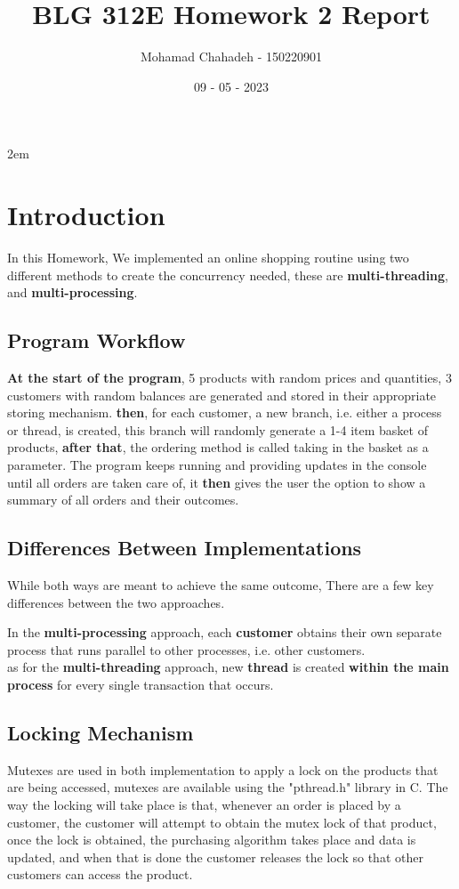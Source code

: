 \documentclass[pdftex,12pt,a4paper]{article}
\title{BLG 312E Homework 2 Report}
\author{Mohamad Chahadeh - 150220901}
\date{09 - 05 - 2023}
\begin{document}
{\def\null\vskip 2em{}\maketitle}

\section{Introduction}
In this Homework, We implemented an online shopping routine using two different methods to create the concurrency needed, these are \textbf{multi-threading}, and \textbf{multi-processing}.

\subsection{Program Workflow}
\textbf{At the start of the program}, 5 products with random prices and quantities, 3 customers with random balances are generated and stored in their appropriate storing mechanism. \textbf{then}, for each customer, a new branch, i.e. either a process or thread, is created, this branch will randomly generate a 1-4 item basket of products, \textbf{after that}, the ordering method is called taking in the basket as a parameter. The program keeps running and providing updates in the console until all orders are taken care of, it \textbf{then} gives the user the option to show a summary of all orders and their outcomes.

\subsection{Differences Between Implementations}
While both ways are meant to achieve the same outcome, There are a few key differences between the two approaches.\\ \par
In the \textbf{multi-processing} approach, each \textbf{customer} obtains their own separate process that runs parallel to other processes, i.e. other customers. 
\\as for the \textbf{multi-threading} approach, new \textbf{thread} is created \textbf{within the main process} for every single transaction that occurs.

\subsection{Locking Mechanism}
Mutexes are used in both implementation to apply a lock on the products that are being accessed, mutexes are available using the "pthread.h" library in C. The way the locking will take place is that, whenever an order is placed by a customer, the customer will attempt to obtain the mutex lock of that product, once the lock is obtained, the purchasing algorithm takes place and data is updated, and when that is done the customer releases the lock so that other customers can access the product.
\end{document}

